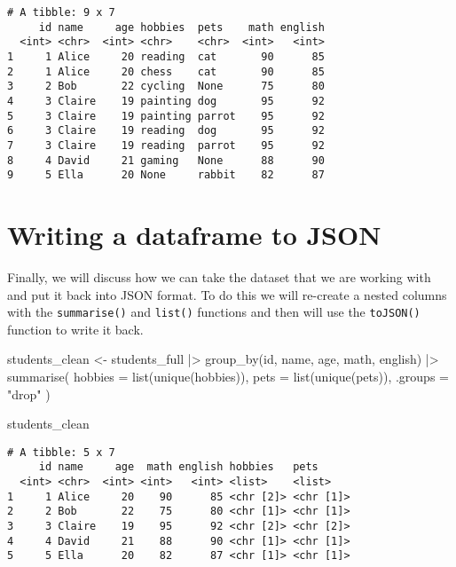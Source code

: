 \documentclass[
  letterpaper,
  DIV=11,
  numbers=noendperiod]{scrreprt}
\newenvironment{Shaded}{\begin{snugshade}}{\end{snugshade}}
\newcommand{\AttributeTok}[1]{\textcolor[rgb]{0.40,0.45,0.13}{#1}}
\newcommand{\FunctionTok}[1]{\textcolor[rgb]{0.28,0.35,0.67}{#1}}
\newcommand{\NormalTok}[1]{\textcolor[rgb]{0.00,0.23,0.31}{#1}}
\newcommand{\OtherTok}[1]{\textcolor[rgb]{0.00,0.23,0.31}{#1}}
\newcommand{\SpecialCharTok}[1]{\textcolor[rgb]{0.37,0.37,0.37}{#1}}
\newcommand{\StringTok}[1]{\textcolor[rgb]{0.13,0.47,0.30}{#1}}
\begin{document}
\begin{verbatim}
# A tibble: 9 x 7
     id name     age hobbies  pets    math english
  <int> <chr>  <int> <chr>    <chr>  <int>   <int>
1     1 Alice     20 reading  cat       90      85
2     1 Alice     20 chess    cat       90      85
3     2 Bob       22 cycling  None      75      80
4     3 Claire    19 painting dog       95      92
5     3 Claire    19 painting parrot    95      92
6     3 Claire    19 reading  dog       95      92
7     3 Claire    19 reading  parrot    95      92
8     4 David     21 gaming   None      88      90
9     5 Ella      20 None     rabbit    82      87
\end{verbatim}

\section{Writing a dataframe to JSON}\label{writing-a-dataframe-to-json}

Finally, we will discuss how we can take the dataset that we are working
with and put it back into JSON format. To do this we will re-create a
nested columns with the \texttt{summarise()} and \texttt{list()}
functions and then will use the \texttt{toJSON()} function to write it
back.

\begin{Shaded}
\begin{Highlighting}[]
\NormalTok{students\_clean }\OtherTok{\textless{}{-}}\NormalTok{ students\_full }\SpecialCharTok{|\textgreater{}}
  \FunctionTok{group\_by}\NormalTok{(id, name, age, math, english) }\SpecialCharTok{|\textgreater{}}
  \FunctionTok{summarise}\NormalTok{(}
    \AttributeTok{hobbies =} \FunctionTok{list}\NormalTok{(}\FunctionTok{unique}\NormalTok{(hobbies)),}
    \AttributeTok{pets =} \FunctionTok{list}\NormalTok{(}\FunctionTok{unique}\NormalTok{(pets)),}
    \AttributeTok{.groups =} \StringTok{"drop"}
\NormalTok{  )}

\NormalTok{students\_clean}
\end{Highlighting}
\end{Shaded}

\begin{verbatim}
# A tibble: 5 x 7
     id name     age  math english hobbies   pets     
  <int> <chr>  <int> <int>   <int> <list>    <list>   
1     1 Alice     20    90      85 <chr [2]> <chr [1]>
2     2 Bob       22    75      80 <chr [1]> <chr [1]>
3     3 Claire    19    95      92 <chr [2]> <chr [2]>
4     4 David     21    88      90 <chr [1]> <chr [1]>
5     5 Ella      20    82      87 <chr [1]> <chr [1]>
\end{verbatim}
\end{document}

